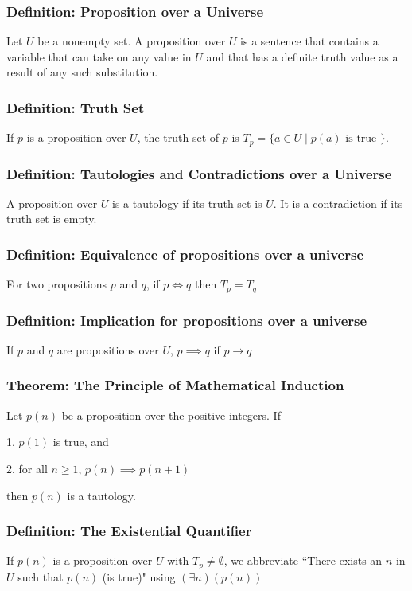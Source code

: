 \documentclass{article}
\begin{document}
\subsubsection*{Definition: Proposition over a Universe}
Let $U$ be a nonempty set. A proposition over $U$ is a sentence that contains a variable that can take on any value in $U$ and that has a definite truth value as a result of any such substitution.

\subsubsection*{Definition: Truth Set}
If $p$ is a proposition over $U$, the truth set of $p$ is $T_p = \{ a \in U \mid p(a) \text{ is true } \}$.

\subsubsection*{Definition: Tautologies and Contradictions over a Universe}
A proposition over $U$ is a tautology if its truth set is $U$. It is a contradiction if its truth set is empty. 

\subsubsection*{Definition: Equivalence of propositions over a universe}
For two propositions $p$ and $q$, if $p \iff q$ then $T_p = T_q$

\subsubsection*{Definition: Implication for propositions over a universe}
If $p$ and $q$ are propositions over $U$, $p \implies q$ if $p \rightarrow q$

\subsubsection*{Theorem: The Principle of Mathematical Induction}
Let $p(n)$ be a proposition over the positive integers. If

1. $p(1)$ is true, and

2. for all $n \geq 1$, $p(n) \implies p(n+1)$

then $p(n)$ is a tautology.

\subsubsection*{Definition: The Existential Quantifier}
If $p(n)$ is a proposition over $U$ with $T_p \neq \emptyset$, we abbreviate ``There exists an $n$ in $U$ such that $p(n)$ (is true)" using $(\exists n )(p(n))$
\end{document}
